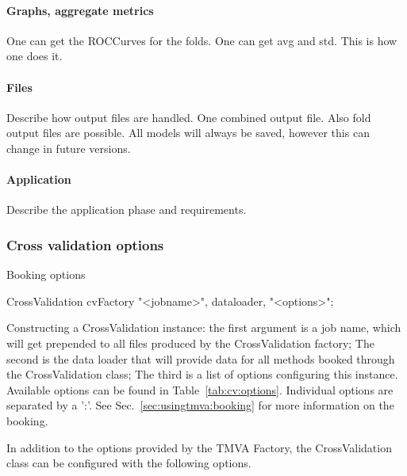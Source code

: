\paragraph{Graphs, aggregate metrics}
One can get the ROCCurves for the folds. One can get avg and std.
This is how one does it.

\paragraph{Files}
Describe how output files are handled. One combined output file. Also fold output files are possible.
All models will always be saved, however this can change in future versions.

\paragraph{Application}
Describe the application phase and requirements.

\subsubsection{Cross validation options}
Booking options
\begin{codeexample}
\begin{tmvacode}
CrossValidation cvFactory {"<jobname>", dataloader, "<options>"};
\end{tmvacode}
\caption[.]{\codeexampleCaptionSize Constructing a CrossValidation instance:
   the first argument is a job name, which will get prepended to all files
   produced by the CrossValidation factory; The second is the data loader that
   will provide data for all methods booked through the CrossValidation class;
   The third is a list of options configuring this instance. Available options
   can be found in Table~\ref{tab:cv:options}.
   Individual options are separated by a ':'. See
   Sec.~\ref{sec:usingtmva:booking} for more information on the booking.}
\end{codeexample}


In addition to the options provided by the TMVA Factory, the CrossValidation class can be configured with the following options.


